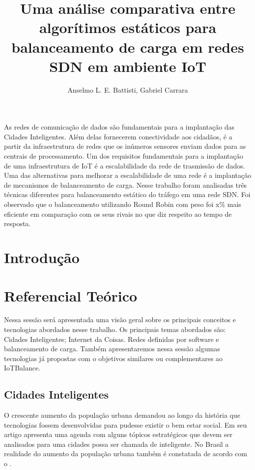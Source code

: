 \documentclass[12pt]{article}
\title{Uma análise comparativa entre algorítimos estáticos para balanceamento de carga em redes SDN em ambiente IoT}
\author{Anselmo L. E. Battisti\inst{1}, Gabriel Carrara\inst{1}}
\begin{document}
 

\maketitle

\begin{resumo} 
As redes de comunicação de dados são fundamentais para a implantação das Cidades Inteligentes. Além delas fornecerem conectividade aos cidadãos, é a partir da infraestrutura de redes que os inúmeros sensores enviam dados para as centrais de processamento. Um dos requisitos fundamentais para a implantação de uma infraestrutura de IoT é a escalabilidade da rede de trasmissão de dados. Uma das alternativas para melhorar a escalabilidade de uma rede é a implantação de mecanismos de balanceamento de carga. Nesse trabalho foram analisadas três técnicas diferentes para balanceamento estático do tráfego em uma rede SDN. Foi observado que o balanceamento utilizando Round Robin com peso foi x\% mais eficiente em comparação com os seus rivais no que diz respeito ao tempo de resposta.
\end{resumo}

\begin{abstract}
    
\end{abstract}

\section{Introdução}


\section{Referencial Teórico}

Nessa sessão será apresentada uma visão geral sobre os principais conceitos e tecnologias abordados nesse trabalho. Os principais temas abordados são: Cidades Inteligentes; Internet da Coisas. Redes definidas por software e balanceamento de carga. Também apresentaremos nessa sessão algumas tecnologias já propostas com o objetivos similares ou complementares ao IoTBalance. 

\subsection{Cidades Inteligentes}

O crescente aumento da população urbana demandou ao longo da história que tecnologias fossem desenvolvidas para pudesse existir o bem estar social. Em seu artigo \cite{Caragliu2011} apresenta uma agenda com alguns tópicos estratégicos que devem ser analisados para uma cidades possa ser chamada de inteligente. No Brasil a realidade do aumento da população urbana também é constatada de acordo com o \cite{IBGE2011}.
\end{document}
